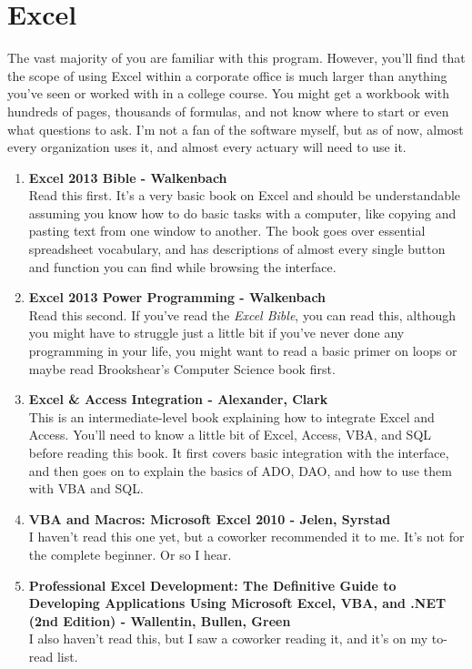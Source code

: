 \documentclass[oneside, titlepage]{article}
\begin{document}
\newpage

\section{Excel}
The vast majority of you are familiar with this program. However, you'll find that the scope of using Excel within a corporate office is much larger than anything you've seen or worked with in a college course. You might get a workbook with hundreds of pages, thousands of formulas, and not know where to start or even what questions to ask. I'm not a fan of the software myself, but as of now, almost every organization uses it, and almost every actuary will need to use it.

\begin{enumerate}
\item{\bfseries Excel 2013 Bible - Walkenbach}\\
Read this first. It's a very basic book on Excel and should be understandable assuming you know how to do basic tasks with a computer, like copying and pasting text from one window to another. The book goes over essential spreadsheet vocabulary, and has descriptions of almost every single button and function you can find while browsing the interface.

\item{\bfseries Excel 2013 Power Programming - Walkenbach}\\
Read this second. If you've read the {\itshape Excel Bible}, you can read this, although you might have to struggle just a little bit if you've never done any programming in your life, you might want to read a basic primer on loops or maybe read Brookshear's Computer Science book first.

\item{\bfseries Excel \& Access Integration - Alexander, Clark}\\
This is an intermediate-level book explaining how to integrate Excel and Access. You'll need to know a little bit of Excel, Access, VBA, and SQL before reading this book. It first covers basic integration with the interface, and then goes on to explain the basics of ADO, DAO, and how to use them with VBA and SQL.

\item{\bfseries VBA and Macros: Microsoft Excel 2010 - Jelen, Syrstad}\\
I haven't read this one yet, but a coworker recommended it to me. It's not for the complete beginner. Or so I hear.

\item{\bfseries Professional Excel Development: The Definitive Guide to Developing Applications Using Microsoft Excel, VBA, and .NET (2nd Edition) - Wallentin, Bullen, Green}\\
I also haven't read this, but I saw a coworker reading it, and it's on my to-read list.
\end{enumerate}
\end{document}
